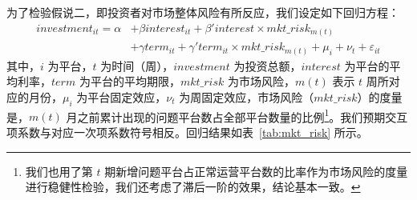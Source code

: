\documentclass[lang=cn,11pt]{elegantpaper}
\begin{document}
为了检验假说二，即投资者对市场整体风险有所反应，我们设定如下回归方程：
\begin{equation}\label{eq:mkt_risk}
      \begin{split}
            investment_{it} = \alpha & + \beta interest_{it} + \beta ' interest \times mkt\_risk_{m(t)} \\
            & + \gamma term_{it} + \gamma ' term_{it} \times mkt\_risk_{m(t)} + \mu_i + \nu_t + \varepsilon_{it}
      \end{split}
\end{equation}
其中，$i$ 为平台，$t$ 为时间（周），$investment$ 为投资总额，$interest$ 为平台的平均利率，$term$ 为平台的平均期限，$mkt\_risk$ 为市场风险，$m(t)$ 表示 $t$ 周所对应的月份，$\mu_i$ 为平台固定效应，$\nu_t$ 为周固定效应，市场风险（$mkt\_risk$）的度量是，$m(t)$ 月之前累计出现的问题平台数占全部平台数量的比例\footnote{我们也用了第 $t$ 期新增问题平台占正常运营平台数的比率作为市场风险的度量进行稳健性检验，我们还考虑了滞后一阶的效果，结论基本一致。}。我们预期交互项系数与对应一次项系数符号相反。回归结果如表~\ref{tab:mkt_risk} 所示。
\end{document}
